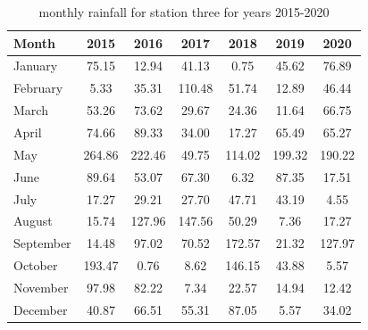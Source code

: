 \documentclass[12pt]{article}
\theoremstyle{definition}
\begin{document}
\begin{table}[ht]
  \centering
  \caption{monthly rainfall for station three for years 2015-2020}
  \label{tab:station3}
  \begin{tabular}{l *{6}{S[table-format=3.2]}}
    \toprule
    \textbf{Month} & \textbf{2015} & \textbf{2016} & \textbf{2017} & \textbf{2018} & \textbf{2019} & \textbf{2020} \\
    \midrule
    January  & 75.15 & 12.94 & 41.13 &  0.75 & 45.62 & 76.89 \\
    February &  5.33 & 35.31 &110.48 & 51.74 & 12.89 & 46.44 \\
    March    & 53.26 & 73.62 & 29.67 & 24.36 & 11.64 & 66.75 \\
    April    & 74.66 & 89.33 & 34.00 & 17.27 & 65.49 & 65.27 \\
    May      &264.86 &222.46 & 49.75 &114.02 &199.32 &190.22 \\
    June     & 89.64 & 53.07 & 67.30 &  6.32 & 87.35 & 17.51 \\
    July     & 17.27 & 29.21 & 27.70 & 47.71 & 43.19 &  4.55 \\
    August   & 15.74 &127.96 &147.56 & 50.29 &  7.36 & 17.27 \\
    September& 14.48 & 97.02 & 70.52 &172.57 & 21.32 &127.97 \\
    October  &193.47 &  0.76 &  8.62 &146.15 & 43.88 &  5.57 \\
    November & 97.98 & 82.22 &  7.34 & 22.57 & 14.94 & 12.42 \\
    December & 40.87 & 66.51 & 55.31 & 87.05 &  5.57 & 34.02 \\
    \bottomrule
  \end{tabular}
\end{table}
\\
\end{document}
